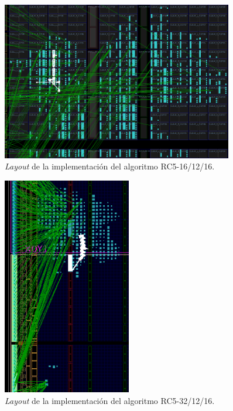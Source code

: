 \begin{figure}[H]
	\centering
	\includegraphics[width=0.9\textwidth]{./images/fig16_12_16_layout}
	\caption{\textit{Layout} de la implementación del algoritmo RC5-16/12/16.}
	\label{fig16_12_16_layout}
\end{figure}

\begin{figure}[H]
	\centering
	\includegraphics[width=0.5\textwidth]{./images/fig32_12_16_layout}
	\caption{\textit{Layout} de la implementación del algoritmo RC5-32/12/16.}
	\label{fig32_12_16_layout}
\end{figure}

